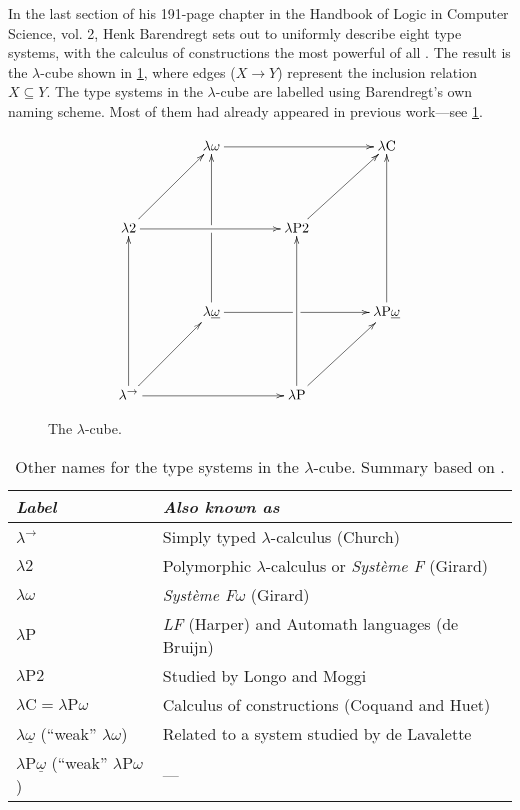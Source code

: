 \documentclass[12pt,toc=bibliography,numbers=noendperiod,
               footnotes=multiple,twoside]{scrartcl}
\begin{document}
In the last section of his 191-page chapter  in the Handbook of Logic in Computer Science, vol. 2, Henk Barendregt sets out to uniformly describe eight type systems, with the calculus of constructions the most powerful of all \autocite{barendregt_lambda_1992}. The result is the \(\lambda\)-cube shown in \cref{fig:lambda-cube}, where edges (\(X \longrightarrow Y\)) represent the inclusion relation \(X \subseteq Y\). The type systems in the \(\lambda\)-cube are labelled using Barendregt's own naming scheme. Most of them had already appeared in previous work---see \cref{tab:lambda-cube-type-systems}.

\begin{figure}
\begin{equation*}
\xymatrix@R46pt@C40pt{%
&\lambda\omega\ar@{->}[rr]&&\lambda\textrm{C} \\
\lambda\textrm{2}\ar@{->}[rr]\ar@{->}[ur]&&\lambda\textrm{P2}\ar@{->}[ur] \\
&\lambda\underline{\omega}\ar@{->}[uu]|!{"2,1";"2,3"}\hole\ar@{->}[rr]|!{"4,3";"2,3"}\hole&&\lambda\textrm{P}\underline{\omega}\ar@{->}[uu] \\
\lambda^{\rightarrow}\ar@{->}[uu]\ar@{->}[rr]\ar@{->}[ur]&&\lambda\textrm{P}\ar@{->}[uu]\ar@{->}[ur]
}
\end{equation*}
\caption{The \(\lambda\)-cube.}
\label{fig:lambda-cube}
\end{figure}

\begin{table}[h]
    \centering
    \begin{tabular}{l l}
        \toprule
        \textit{Label} & \textit{Also known as} \\
        \midrule
        \(\lambda^{\rightarrow}\) & Simply typed \(\lambda\)-calculus (Church) \\
        \(\lambda\textrm{2}\) & Polymorphic \(\lambda\)-calculus or \emph{Système F} (Girard) \\
        \(\lambda\omega\) & \emph{Système F\(\omega\)} (Girard) \\
        \(\lambda\textrm{P}\) & \emph{LF} (Harper) and Automath languages (de Bruijn) \\
        \(\lambda\textrm{P2}\) & Studied by Longo and Moggi \\
        \(\lambda\textrm{C} = \lambda\textrm{P}\omega\) & Calculus of constructions (Coquand and Huet) \\
        \(\lambda\underline{\omega}\) (\enquote{weak} \(\lambda\omega\)) & Related to a system studied by de Lavalette \\
        \(\lambda\textrm{P}\underline{\omega}\) (\enquote{weak} \(\lambda\textrm{P}\omega\)) & --- \\
        \bottomrule
    \end{tabular}
    \caption{Other names for the type systems in the \(\lambda\)-cube. Summary based on \textcite[193]{barendregt_lambda_1992}.}
    \label{tab:lambda-cube-type-systems}
\end{table}
\end{document}
